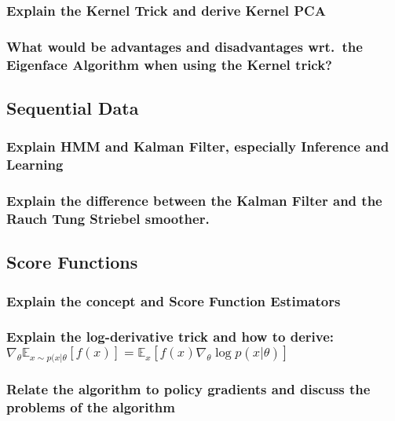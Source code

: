 \documentclass{article}
\newcommand{\E}[0]{\mathbb{E}}
\begin{document}
\subsubsection{Explain the Kernel Trick and derive Kernel PCA}

\subsubsection{What would be advantages and disadvantages wrt.~the Eigenface Algorithm when using the Kernel trick?}







\subsection{Sequential Data}

\subsubsection{Explain HMM and Kalman Filter, especially Inference and Learning}

\subsubsection{Explain the difference between the Kalman Filter and the Rauch Tung Striebel smoother.}

\subsection{Score Functions}

\subsubsection{Explain the concept and Score Function Estimators}

\subsubsection{Explain the log-derivative trick and how to derive:
$\nabla_\theta \E_{x \sim p(x|\theta}[f(x)] = \E_x[f(x) \nabla_\theta \log p(x|\theta)]$}

\subsubsection{Relate the algorithm to policy gradients and discuss the problems of the algorithm}
\end{document}
